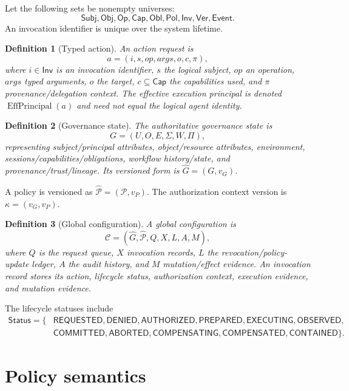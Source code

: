 \documentclass[11pt,a4paper]{article}
\newtheorem{definition}{Definition}[section]
\theoremstyle{remark}
\newcommand{\CFG}{\mathcal{C}}
\begin{document}
Let the following sets be nonempty universes:
\[
\mathsf{Subj},\mathsf{Obj},\mathsf{Op},\mathsf{Cap},
\mathsf{Obl},\mathsf{Pol},\mathsf{Inv},\mathsf{Ver},\mathsf{Event}.
\]
An invocation identifier is unique over the system lifetime.

\begin{definition}[Typed action]
An action request is
\[
a=(i,s,op,args,o,c,\pi),
\]
where $i\in\mathsf{Inv}$ is an invocation identifier, $s$ the logical subject, $op$ an operation, $args$ typed arguments, $o$ the target, $c\subseteq\mathsf{Cap}$ the capabilities used, and $\pi$ provenance/delegation context. The effective execution principal is denoted $\operatorname{EffPrincipal}(a)$ and need not equal the logical agent identity.
\end{definition}

\begin{definition}[Governance state]
The authoritative governance state is
\[
G=(U,O,E,\Sigma,W,\Pi),
\]
representing subject/principal attributes, object/resource attributes, environment, sessions/capabilities/obligations, workflow history/state, and provenance/trust/lineage. Its versioned form is $\widehat G=(G,v_G)$.
\end{definition}

A policy is versioned as $\widehat{\mathcal P}=(\mathcal P,v_P)$. The authorization context version is $\kappa=(v_G,v_P)$.

\begin{definition}[Global configuration]
A global configuration is
\[
\CFG=(\widehat G,\widehat{\mathcal P},Q,X,L,A,M),
\]
where $Q$ is the request queue, $X$ invocation records, $L$ the revocation/policy-update ledger, $A$ the audit history, and $M$ mutation/effect evidence. An invocation record stores its action, lifecycle status, authorization context, execution evidence, and mutation evidence.
\end{definition}

The lifecycle statuses include
\[
\begin{split}
\mathsf{Status}=\{&
\mathsf{REQUESTED},\mathsf{DENIED},\mathsf{AUTHORIZED},
\mathsf{PREPARED},\mathsf{EXECUTING},\mathsf{OBSERVED},\\
&\mathsf{COMMITTED},\mathsf{ABORTED},\mathsf{COMPENSATING},
\mathsf{COMPENSATED},\mathsf{CONTAINED}\}.
\end{split}
\]

\section{Policy semantics}
\end{document}
